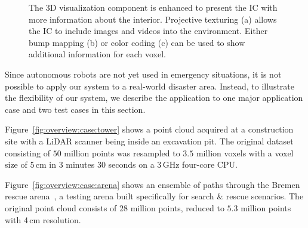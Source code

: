 \documentclass{egpubl}
\begin{document}
\begin{figure}
{		
		\label{fig:imageenhancement:colors}
	}
	\caption{The 3D visualization component is enhanced to present the IC with more information about the interior. Projective texturing (a) allows the IC to include images and videos into the environment. Either bump mapping (b) or color coding (c) can be used to show additional information for each voxel.}
	\label{fig:imageenhancement}
\end{figure}

Since autonomous robots are not yet used in emergency situations, it is not possible to apply our system to a real-world disaster area. Instead, to illustrate the flexibility of our system, we describe the application to one major application case and two test cases in this section.

 Figure~\ref{fig:overview:case:tower} shows a point cloud acquired at a construction site with a LiDAR scanner being inside an excavation pit. The original dataset consisting of $50$ million points was resampled to $3.5$ million voxels with a voxel size of 5\,cm in 3 minutes 30 seconds on a 3\,GHz four-core CPU. 

 Figure~\ref{fig:overview:case:arena} shows an ensemble of paths through the Bremen rescue arena~\cite{varsadan08}, a testing arena built specifically for search \& rescue scenarios. The original point cloud consists of $28$ million points, reduced to $5.3$ million points with 4\,cm resolution.
\end{document}
